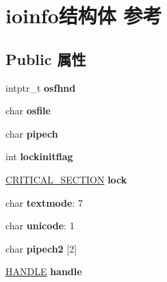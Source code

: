 \hypertarget{structioinfo}{}\section{ioinfo结构体 参考}
\label{structioinfo}
\subsection*{Public 属性}
\begin{DoxyCompactItemize}
\item 
\mbox{\label{structioinfo_a0078c30ec66583d800efb990d9b0abf7}} 
intptr\+\_\+t {\bfseries osfhnd}
\item 
\mbox{\label{structioinfo_a05f53c6e27bf84e006907aafb37ad658}} 
char {\bfseries osfile}
\item 
\mbox{\label{structioinfo_a2daf7216924d5c027f887f8f3f9640cc}} 
char {\bfseries pipech}
\item 
\mbox{\label{structioinfo_ad9efd31c1b2f774c28baf278f93d3fa1}} 
int {\bfseries lockinitflag}
\item 
\mbox{\label{structioinfo_a24e741fd6e1fa838f45a1384ff6e6479}} 
\hyperlink{struct___c_r_i_t_i_c_a_l___s_e_c_t_i_o_n}{C\+R\+I\+T\+I\+C\+A\+L\+\_\+\+S\+E\+C\+T\+I\+ON} {\bfseries lock}
\item 
\mbox{\label{structioinfo_aa4e73e75bdc85fb370d9bc21f3c7e98e}} 
char {\bfseries textmode}\+: 7
\item 
\mbox{\label{structioinfo_a0ec17c8e928ea4c508271fbbe53f8ecd}} 
char {\bfseries unicode}\+: 1
\item 
\mbox{\label{structioinfo_a85a9e2e56fcc54fba4954fc77190d434}} 
char {\bfseries pipech2} \mbox{[}2\mbox{]}
\item 
\mbox{\label{structioinfo_ad112521ae89c6c80bf39687e6ac1943d}} 
\hyperlink{interfacevoid}{H\+A\+N\+D\+LE} {\bfseries handle}
\item 
\mbox{\label{structioinfo_abfad8021ec01aaca067e3dc2e02c8173}} 

\end{DoxyCompactItemize}

